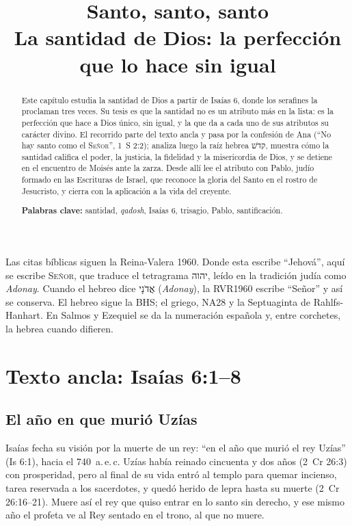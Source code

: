 \documentclass[11pt,letterpaper]{article}
\title{\color{azul}\bfseries Santo, santo, santo\\[4pt]\large\color{gris}\mdseries La santidad de Dios: la perfección que lo hace sin igual}
\author{}\date{}
\newcommand{\heb}[1]{\mbox{\foreignlanguage{hebrew}{#1}}}
\newcommand{\SENOR}{\textsc{Señor}}
\begin{document}
\maketitle\thispagestyle{empty}

\begin{abstract}\noindent
Este capítulo estudia la santidad de Dios a partir de Isaías 6, donde los serafines la proclaman tres veces. Su tesis es que la santidad no es un atributo más en la lista: es la perfección que hace a Dios único, sin igual, y la que da a cada uno de sus atributos su carácter divino. El recorrido parte del texto ancla y pasa por la confesión de Ana (``No hay santo como el \SENOR'', 1~S 2:2); analiza luego la raíz hebrea \heb{קדשׁ}, muestra cómo la santidad califica el poder, la justicia, la fidelidad y la misericordia de Dios, y se detiene en el encuentro de Moisés ante la zarza. Desde allí lee el atributo con Pablo, judío formado en las Escrituras de Israel, que reconoce la gloria del Santo en el rostro de Jesucristo, y cierra con la aplicación a la vida del creyente.
\par\smallskip\noindent\textbf{Palabras clave:} santidad, \emph{qadosh}, Isaías 6, trisagio, Pablo, santificación.\end{abstract}

\begin{nota}
Las citas bíblicas siguen la Reina-Valera 1960. Donde esta escribe ``Jehová'', aquí se escribe \SENOR, que traduce el tetragrama \heb{יהוה}, leído en la tradición judía como \emph{Adonay}. Cuando el hebreo dice \heb{אֲדֹנָי} (\emph{Adonay}), la RVR1960 escribe ``Señor'' y así se conserva. El hebreo sigue la BHS; el griego, NA28 y la Septuaginta de Rahlfs-Hanhart. En Salmos y Ezequiel se da la numeración española y, entre corchetes, la hebrea cuando difieren.
\end{nota}

\section{Texto ancla: Isaías 6:1--8}

\subsection{El año en que murió Uzías}
Isaías fecha su visión por la muerte de un rey: ``en el año que murió el rey Uzías'' (Is 6:1), hacia el 740~a.\,e.\,c. Uzías había reinado cincuenta y dos años (2~Cr 26:3) con prosperidad, pero al final de su vida entró al templo para quemar incienso, tarea reservada a los sacerdotes, y quedó herido de lepra hasta su muerte (2~Cr 26:16--21). Muere así el rey que quiso entrar en lo santo sin derecho, y ese mismo año el profeta ve al Rey sentado en el trono, al que no muere.
\end{document}
